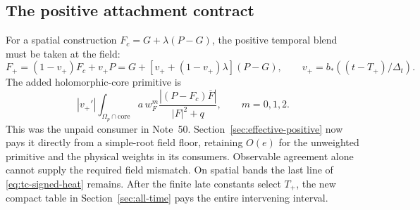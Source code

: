 \subsection{The positive attachment contract}
For a spatial construction $F_c=G+\lambda(P-G)$, the positive temporal
blend must be taken at the field:
\begin{equation}
 F_+=(1-v_+)F_c+v_+P
   =G+[v_++(1-v_+)\lambda](P-G),\qquad
 v_+=b_*((t-T_+)/\Delta_t).
 \label{eq:tc-positive-join}
\end{equation}
The added holomorphic-core primitive is
\begin{equation}
 |v_+'|\int_{\Omega_p\cap\mathrm{core}}
 a\,w_F^m\frac{|(P-F_c)\overline F|}{|F|^2+q},\qquad m=0,1,2.
 \label{eq:tc-unpaid-primitive}
\end{equation}
This was the unpaid consumer in Note~50. Section~\ref{sec:effective-positive}
now pays it directly from a simple-root field floor, retaining $O(e)$
for the unweighted primitive and the physical weights in its consumers.
Observable agreement alone cannot supply the required field mismatch.
On spatial bands the last line of \eqref{eq:tc-signed-heat} remains.
After the finite late constants select $T_+$, the new compact table in
Section~\ref{sec:all-time} pays the entire intervening interval.
